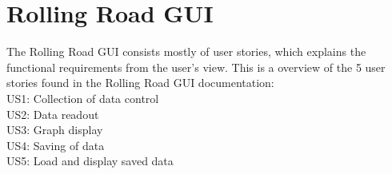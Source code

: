 \section{Rolling Road GUI}
The Rolling Road GUI consists mostly of user stories, which explains the functional requirements from the user's view.
This is a overview of the 5 user stories found in the Rolling Road GUI documentation:\\
US1: Collection of data control\\
US2: Data readout\\
US3: Graph display\\
US4: Saving of data\\
US5: Load and display saved data\\